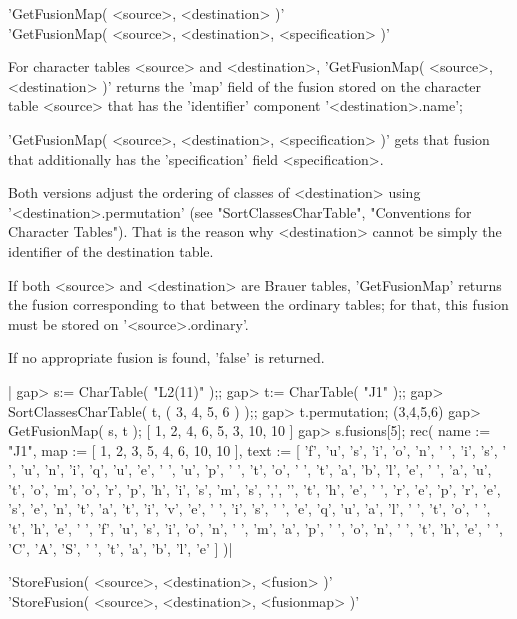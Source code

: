 'GetFusionMap( <source>, <destination> )'\\
'GetFusionMap( <source>, <destination>, <specification> )'

For character tables <source> and <destination>,
'GetFusionMap( <source>, <destination> )' returns the 'map' field of the
fusion stored on the character table <source> that has the 'identifier'
component '<destination>.name';

'GetFusionMap( <source>, <destination>, <specification> )' gets that
fusion that additionally has the 'specification' field <specification>.

Both versions adjust the ordering of classes of <destination> using
'<destination>.permutation' (see "SortClassesCharTable", "Conventions for
Character Tables").
That is the reason why <destination> cannot be simply the identifier of
the destination table.

If both <source> and <destination> are Brauer tables, 'GetFusionMap'
returns the fusion corresponding to that between the ordinary tables;
for that, this fusion must be stored on '<source>.ordinary'.

If no appropriate fusion is found, 'false' is returned.

|    gap> s:= CharTable( "L2(11)" );;
    gap> t:= CharTable( "J1" );;
    gap> SortClassesCharTable( t, ( 3, 4, 5, 6 ) );;
    gap> t.permutation;
    (3,4,5,6)
    gap> GetFusionMap( s, t );
    [ 1, 2, 4, 6, 5, 3, 10, 10 ]
    gap> s.fusions[5];
    rec(
      name := "J1",
      map := [ 1, 2, 3, 5, 4, 6, 10, 10 ],
      text := [ 'f', 'u', 's', 'i', 'o', 'n', ' ', 'i', 's', ' ', 'u',
          'n', 'i', 'q', 'u', 'e', ' ', 'u', 'p', ' ', 't', 'o', ' ',
          't', 'a', 'b', 'l', 'e', ' ', 'a', 'u', 't', 'o', 'm', 'o',
          'r', 'p', 'h', 'i', 's', 'm', 's', ',', '\n', 't', 'h', 'e',
          ' ', 'r', 'e', 'p', 'r', 'e', 's', 'e', 'n', 't', 'a', 't',
          'i', 'v', 'e', ' ', 'i', 's', ' ', 'e', 'q', 'u', 'a', 'l',
          ' ', 't', 'o', ' ', 't', 'h', 'e', ' ', 'f', 'u', 's', 'i',
          'o', 'n', ' ', 'm', 'a', 'p', ' ', 'o', 'n', ' ', 't', 'h',
          'e', ' ', 'C', 'A', 'S', ' ', 't', 'a', 'b', 'l', 'e' ] )|

%
%

'StoreFusion( <source>, <destination>, <fusion> )'\\
'StoreFusion( <source>, <destination>, <fusionmap> )'

